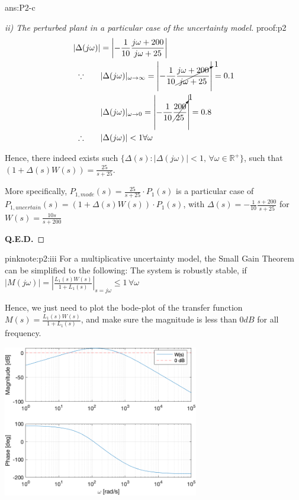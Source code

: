 \documentclass{tron}
\begin{document}
\begin{answer}{ans:P2-c}
\begin{proof}[ii) The perturbed plant in  a particular case of the uncertainty model]{proof:p2}
		\begin{align}
			|\Delta(j\omega)| &= \left|- \frac{1}{10} \frac{j\omega+200}{j\omega+25}\right| \\
			\because \qquad & |\Delta(j\omega)|_{\omega\rightarrow\infty} = \left|- \frac{1}{10} \cancelto{1}{\frac{j\omega+200}{j\omega+25}} \right| = 0.1\\
							& |\Delta(j\omega)|_{\omega\rightarrow0} = \left|- \frac{1}{10} \cancelto{1}{\frac{200}{25}} \right| = 0.8\\
			\therefore \qquad & |\Delta(j\omega)| < 1 \forall \omega
		\end{align}
		
		Hence, there indeed exists such $\{\Delta(s) : |\Delta(j\omega)| < 1 ,\,\forall \omega \in \mathbb{R^+}\}$, such that $(1 + \Delta(s)W(s)) = \frac{25}{s + 25}$. 
		
		More specifically, $P_{1,mode}(s) = \frac{25}{s+25} \cdot P_1(s)$ is a particular case of $P_{1,uncertain}(s) = (1 + \Delta(s) W(s))\cdot P_1(s)$, with $\Delta(s) = - \frac{1}{10} \frac{s+200}{s+25}$ for $W(s) = \frac{10s}{s + 200}$		
		
		\textbf{Q.E.D.}
	\end{proof}


	\begin{note}{pink}{note:p2:iii}
		For a multiplicative uncertainty model, the Small Gain Theorem can be simplified to the following:
			\qquad The system is robustly stable, if $|M(j\omega)| = |\frac{L_1(s) W(s)}{1 + L_1(s)}|_{s=j\omega} \leq 1 \, \forall \omega$
			
		Hence, we just need to plot the bode-plot of the transfer function $M(s) = \frac{L_1(s) W(s)}{1 + L_1(s)}$, and make sure the magnitude is less than $0\unit{dB}$ for all frequency.
		
		{	
			\centering
			\includegraphics[height=250px]{../matlab/output/q2/c-iii}
		}	
		

\end{note}
\end{answer}
\end{document}
